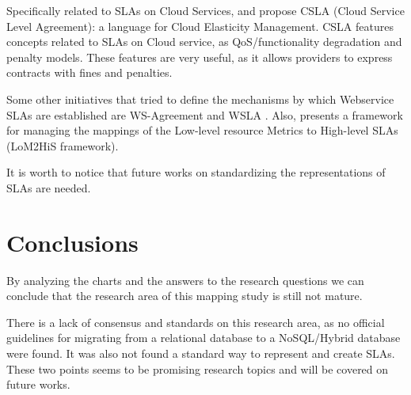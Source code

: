 \documentclass[a4paper]{IEEEtran}
\begin{document}
Specifically related to SLAs on Cloud Services, \cite{6846456} and \cite{kouki:hal-00675077} propose CSLA (Cloud Service Level Agreement): a language for Cloud Elasticity Management. CSLA features concepts related to SLAs on Cloud service,  as QoS/functionality degradation and penalty models. These features are very useful, as it allows providers to express contracts with fines and penalties. 

Some other initiatives that tried to define the mechanisms by which Webservice SLAs are established are WS-Agreement \cite{citeulike:2805191} and WSLA \cite{4578560}. Also, \cite{5547150} presents a framework for managing the mappings of the Low-level resource Metrics to High-level SLAs (LoM2HiS framework). 


It is worth to notice that future works on standardizing the representations of SLAs are needed. 

\section{Conclusions}
By analyzing the charts and the answers to the research questions we can conclude that the research area of this mapping study is still not mature. 

There is a lack of consensus and standards on this research area, as no official guidelines for migrating from a relational database to a NoSQL/Hybrid database were found. It was also not found a standard way to represent and create SLAs. These two points seems to be promising research topics and will be covered on future works.


%


	
\end{document}
